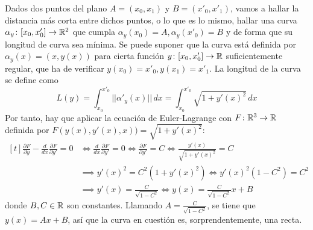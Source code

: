 \documentclass[12pt]{report}
\begin{document}
\begin{example}
Dados dos puntos del plano $A = (x_0,x_1)$ y $B = (x'_0,x'_1)$, vamos a hallar la distancia más corta entre dichos puntos, o lo que es lo mismo, hallar una curva $\alpha_y \colon [x_0,x'_0] \to \mathbb R^2$ que cumpla $\alpha_y(x_0) = A, \alpha_y(x'_0) = B$ y de forma que su longitud de curva sea mínima. Se puede suponer que la curva está definida por $\alpha_y(x) = (x,y(x))$ para cierta función $y \colon [x_0,x'_0] \to \mathbb R$ suficientemente regular, que ha de verificar $y(x_0) = x'_0, y(x_1) = x'_1$. La longitud de la curva se define como
\[L(y) = \int_{x_0}^{x'_0} ||\alpha'_y(x)|| \, dx = \int_{x_0}^{x'_0} \sqrt{1+y'(x)^2} \, dx\]
Por tanto, hay que aplicar la ecuación de Euler-Lagrange con $F \colon \mathbb R^3 \to \mathbb R$ definida por $F(y(x),y'(x),x)) = \sqrt{1+y'(x)^2}$:
\[
\begin{aligned}[t]
\frac{\partial F}{\partial y}-\frac{d}{dx} \frac{\partial F}{\partial y'} = 0 &\iff \frac{d}{dx} \frac{\partial F}{\partial y'} = 0 \iff \frac{\partial F}{\partial y'} = C \iff \frac{y'(x)}{\sqrt{1+y'(x)^2}} = C \\
&\implies y'(x)^2 = C^2(1+y'(x)^2) \iff y'(x)^2(1-C^2)= C^2 \\
&\implies y'(x) = \frac{C}{\sqrt{1-C^2}} \iff y(x) = \frac{C}{\sqrt{1-C^2}}x+B
\end{aligned}
\]
donde $B,C \in \mathbb R$ son constantes. Llamando $A = \frac{C}{\sqrt{1-C^2}}$, se tiene que $y(x) = Ax+B$, así que la curva en cuestión es, sorprendentemente, una recta.
\end{example}
\end{document}
